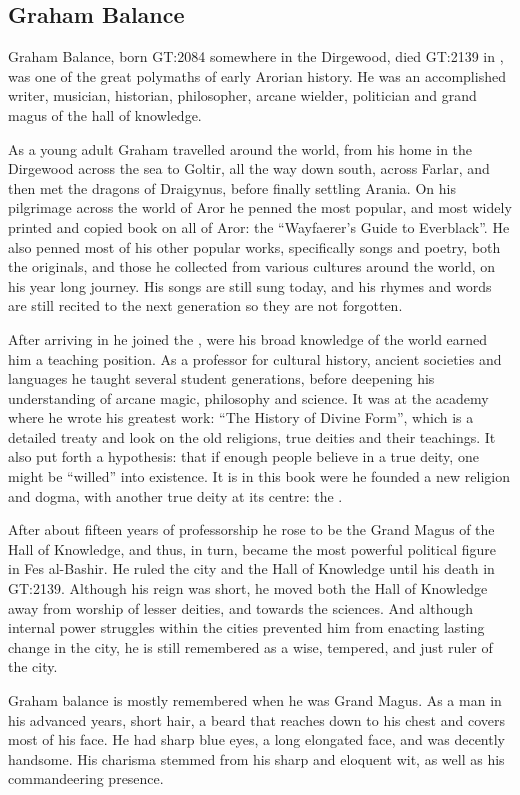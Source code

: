 \subsection{Graham Balance}
\label{sec:Graham Balance}

Graham Balance, born GT:2084 somewhere in the Dirgewood, died GT:2139 in
, was one of the great polymaths of early Arorian
history. He was an accomplished writer, musician, historian, philosopher,
arcane wielder, politician and grand magus of the hall of knowledge.

As a young adult Graham travelled around the world, from his home in the
Dirgewood across the sea to Goltir, all the way down south, across Farlar, and
then met the dragons of Draigynus, before finally settling Arania. On his
pilgrimage across the world of Aror he penned the most popular, and most
widely printed and copied book on all of Aror: the ``Wayfaerer's Guide to
Everblack''. He also penned most of his other popular works, specifically songs
and poetry, both the originals, and those he collected from various cultures
around the world, on his year long journey. His songs are still sung today,
and his rhymes and words are still recited to the next generation so they are
not forgotten.

After arriving in  he joined the , were his broad knowledge of the world earned him a teaching
position. As a professor for cultural history, ancient societies and languages
he taught several student generations, before deepening his understanding of
arcane magic, philosophy and science. It was at the academy where he wrote his
greatest work: ``The History of Divine Form'', which is a detailed treaty and
look on the old religions, true deities and their teachings. It also put forth
a hypothesis: that if enough people believe in a true deity, one might be
``willed'' into existence. It is in this book were he founded a new religion
and dogma, with another true deity at its centre: the .

After about fifteen years of professorship he rose to be the Grand Magus of
the Hall of Knowledge, and thus, in turn, became the most powerful political
figure in Fes al-Bashir. He ruled the city and the Hall of Knowledge until his
death in GT:2139. Although his reign was short, he moved both the Hall of
Knowledge away from worship of lesser deities, and towards the sciences. And
although internal power struggles within the cities prevented him from
enacting lasting change in the city, he is still remembered as a wise,
tempered, and just ruler of the city.

Graham balance is mostly remembered when he was Grand Magus. As a man in his
advanced years, short hair, a beard that reaches down to his chest and covers
most of his face. He had sharp blue eyes, a long elongated face, and was
decently handsome. His charisma stemmed from his sharp and eloquent wit, as
well as his commandeering presence.
